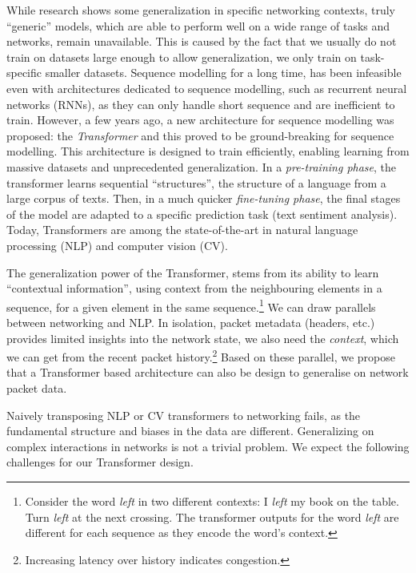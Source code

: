 While research shows some generalization in specific networking contexts\cite{jayDeepReinforcementLearning2019}, truly ``generic'' models, which are able to perform well on a wide range of tasks and networks, remain unavailable. This is caused by the fact that we usually do not train on datasets large enough to allow generalization, we only train on task-specific smaller datasets. Sequence modelling for a long time, has been infeasible even with architectures dedicated to sequence modelling, such as recurrent neural networks (RNNs), as they can only handle short sequence and are inefficient to train\cite{factor}. However, a few years ago, a new architecture for sequence modelling was proposed: the \emph{Transformer}\cite{vaswaniAttentionAllYou2017} and this proved to be ground-breaking for sequence modelling. This architecture is designed to train efficiently, enabling learning from massive datasets and unprecedented generalization. In a \emph{pre-training phase}, the transformer learns sequential ``structures'', \eg the structure of a language from a large corpus of texts. Then, in a much quicker \emph{fine-tuning phase}, the final stages of the model are adapted to a specific prediction task (\eg text sentiment analysis). Today, Transformers are among the state-of-the-art in natural language processing (NLP\cite{recentnlp}) and computer vision (CV\cite{cvsurvey}).

The generalization power of the Transformer, stems from its ability to learn ``contextual information'', using context from the neighbouring elements in a sequence, for a given element in the same sequence\cite{devlinBERTPretrainingDeep2019}.\footnote{Consider the word \emph{left} in two different contexts: I \emph{left} my book on the table. Turn \emph{left} at the next crossing. The transformer outputs for the word \emph{left} are different for each sequence as they encode the word's context.}
We can draw parallels between networking and NLP. In isolation, packet metadata (headers, etc.) provides limited insights into the network state, we also need the \emph{context}, \ie which we can get from the recent packet history.\footnote{Increasing latency over history indicates congestion.} Based on these parallel, we propose that a Transformer based architecture can also be design to generalise on network packet data. 

Naively transposing NLP or CV transformers to networking fails, as the fundamental structure and biases\cite{biases} in the data are different. Generalizing on complex interactions in networks is not a trivial problem. We expect the following challenges for our Transformer design.


